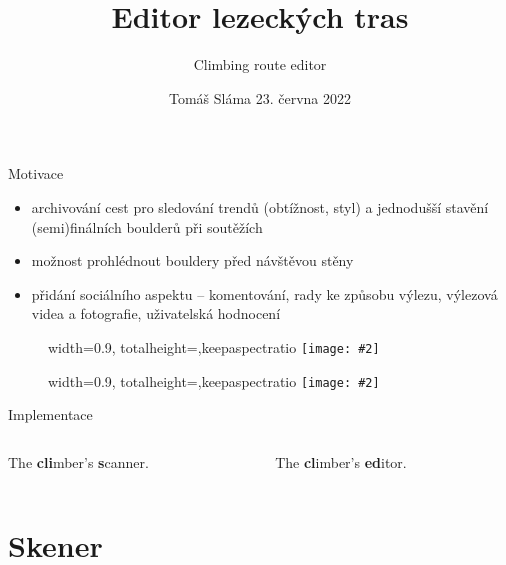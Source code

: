 \documentclass[czech]{beamer}
\title{Editor lezeckých tras}
\subtitle{Climbing route editor}
\author{}
\date{Tomáš Sláma \hfill 23. června 2022}
\makeatletter
\newcommand{\fitimage}[2][\@nil]{
	\begin{figure}
		\begin{adjustbox}{width=0.9\textwidth, totalheight=\textheight-2\baselineskip-2\baselineskip,keepaspectratio}
			\texttt{[image: \#2]}
		\end{adjustbox}
		\def\tmp{#1}%
	 \ifx\tmp\@nnil
			\else
			\caption*{#1}
		\fi
	\end{figure}
}
\makeatother
\begin{document}
	\begin{frame}
		\maketitle
	\end{frame}

	\begin{frame}{Motivace}
		\begin{itemize}
			\item archivování cest pro sledování trendů (obtížnost, styl) a jednodušší stavění (semi)finálních boulderů při soutěžích
			\item možnost prohlédnout bouldery před návštěvou stěny
			\item přidání sociálního aspektu -- komentování, rady ke způsobu výlezu, výlezová videa a fotografie, uživatelská hodnocení
		\end{itemize}

		\begin{minipage}[t]{0.5\textwidth}
			\fitimage{images/capture-1.jpg}
		\end{minipage}%
		\hfill
		\begin{minipage}[t]{0.5\textwidth}
			\fitimage{images/capture-2.jpg}
		\end{minipage}
	\end{frame}

	\begin{frame}{Implementace}
		\begin{columns}[c]
			\begin{column}{0.5\textwidth}
				\begin{center}
					

					The \textbf{cli}mber's \textbf{s}canner.
				\end{center}
			\end{column}
			\begin{column}{0.5\textwidth}
				\begin{center}
					

					The \textbf{cl}imber's \textbf{ed}itor.
				\end{center}
			\end{column}
		\end{columns}

	\end{frame}

	\section{Skener}
\end{document}
